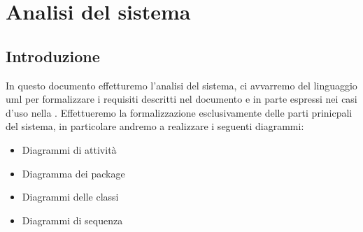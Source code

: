 \chapter{Analisi del sistema}

\section{Introduzione}
In questo documento effetturemo l'analisi del sistema, ci avvarremo del linguaggio \gls{uml} per formalizzare i requisiti descritti nel documento  e in parte espressi nei casi d'uso nella .
Effettueremo la formalizzazione esclusivamente delle parti prinicpali del sistema, in particolare andremo a realizzare i seguenti diagrammi:
\begin{itemize}
	\item Diagrammi di attività
	\item Diagramma dei package
	\item Diagrammi delle classi
	\item Diagrammi di sequenza
\end{itemize}

